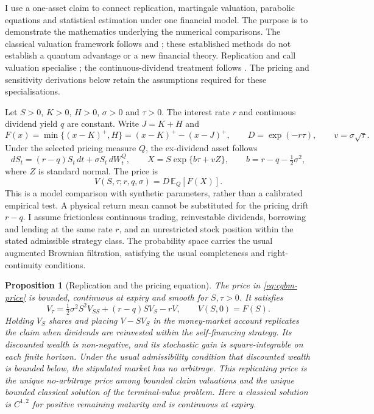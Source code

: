 \documentclass[11pt]{article}
\newtheorem{proposition}[theorem]{Proposition}
\begin{document}
I use a one-asset claim to connect replication, martingale valuation,
parabolic equations and statistical estimation under one financial model.
The purpose is to demonstrate the mathematics underlying the numerical
comparisons. The classical valuation framework follows
\citet{blackscholes1973} and \citet{merton1973}; these established methods
do not establish a quantum advantage or a new financial theory. Replication and call valuation specialise
\citet{blackscholes1973}; the continuous-dividend treatment follows
\citet{merton1973}. The pricing and sensitivity derivations below retain
the assumptions required for these specialisations.

Let $S>0$, $K>0$, $H>0$, $\sigma>0$ and $\tau>0$. The interest rate $r$ and
continuous dividend yield $q$ are constant. Write $J=K+H$ and
\begin{equation}
 F(x)=\min\{(x-K)^+,H\}=(x-K)^+-(x-J)^+,
 \qquad D=\exp(-r\tau),\qquad v=\sigma\sqrt{\tau}.
 \label{eq:cgbm-payoff}
\end{equation}
Under the selected pricing measure $Q$, the ex-dividend asset follows
\begin{equation}
 dS_t=(r-q)S_t\,dt+\sigma S_t\,dW_t^Q,
 \qquad
 X=S\exp\{b\tau+vZ\},
 \qquad b=r-q-\tfrac12\sigma^2,
 \label{eq:cgbm-law}
\end{equation}
where $Z$ is standard normal. The price is
\begin{equation}
 V(S,\tau;r,q,\sigma)=D\,\mathbb E_Q[F(X)].
 \label{eq:cgbm-price}
\end{equation}
This is a model comparison with synthetic parameters, rather than a
calibrated empirical test. A physical return mean cannot be substituted
for the pricing drift $r-q$.
I assume frictionless continuous trading, reinvestable dividends,
borrowing and lending at the same rate $r$, and an unrestricted stock
position within the stated admissible strategy class. The probability
space carries the usual augmented Brownian filtration, satisfying the
usual completeness and right-continuity conditions.

\begin{proposition}[Replication and the pricing equation]
\label{prop:cgbm-replication}
The price in \eqref{eq:cgbm-price} is bounded, continuous at expiry and smooth
for $S,\tau>0$. It satisfies
\begin{equation}
 V_\tau=\tfrac12\sigma^2S^2V_{SS}+(r-q)SV_S-rV,
 \qquad V(S,0)=F(S).
 \label{eq:cgbm-pde}
\end{equation}
Holding $V_S$ shares and placing $V-SV_S$ in the money-market account
replicates the claim when dividends are reinvested within the
self-financing strategy. Its discounted wealth is non-negative, and its
stochastic gain is square-integrable on each finite horizon. Under the
usual admissibility condition that discounted wealth is bounded below,
the stipulated market has no arbitrage. This replicating price is the
unique no-arbitrage price among bounded claim valuations and the unique
bounded classical solution of the terminal-value problem. Here a classical
solution is $C^{1,2}$ for positive remaining maturity and is continuous
at expiry.
\end{proposition}
\end{document}
